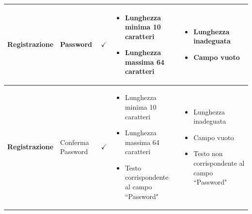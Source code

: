 \documentclass[12pt]{article}
\begin{document}
\begin{longtable}{|l|l|l|l|l|}
 \textbf{Registrazione} & Password & $\checkmark$ & \begin{minipage}{3.5cm}
 \vspace{5pt}
 \begin{itemize}
 \item Lunghezza minima 10 caratteri
 \item Lunghezza massima 64 caratteri
 \end{itemize}
 \vspace{5pt}
 \end{minipage} & \begin{minipage}{4cm}
 \vspace{5pt}
 \begin{itemize}
 \item Lunghezza inadeguata
 \item Campo vuoto
 \end{itemize}
 \vspace{5pt}
 \end{minipage} \\ \hline
 
 \textbf{Registrazione} & Conferma Password & $\checkmark$ & \begin{minipage}{3.5cm}
 \vspace{5pt}
 \begin{itemize}
 \item Lunghezza minima 10 caratteri
 \item Lunghezza massima 64 caratteri
 \item Testo corrispondente al campo ``Password"
 \end{itemize}
 \vspace{5pt}
 \end{minipage} & \begin{minipage}{4cm}
 \vspace{5pt}
 \begin{itemize}
 \item Lunghezza inadeguata
 \item Campo vuoto
 \item Testo non corrispondente al campo ``Password"
 \end{itemize}
 \vspace{5pt}
 \end{minipage} \\ \hline
 

\end{longtable}
\end{document}
